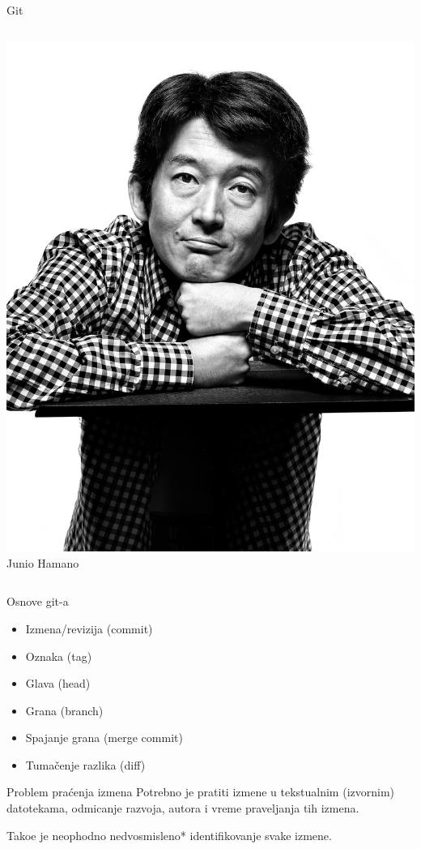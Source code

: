 \documentclass{beamer}
\begin{document}
\begin{frame}{Git}
\begin{columns}
\begin{center}
			\includegraphics[scale=0.08]{hamano.jpg}\\
			Junio Hamano
		\end{center}
	\end{columns}
\end{frame}

\begin{frame}{Osnove git-a}
	\begin{itemize}
		\item Izmena/revizija (commit)
		      \pause
		\item Oznaka (tag)
		      \pause
		\item Glava (head)
		      \pause
		\item Grana (branch)
		      \pause
		\item Spajanje grana (merge commit)
		      \pause
		\item Tuma\v cenje razlika (diff)
	\end{itemize}
\end{frame}

\begin{frame}{Problem pra\' cenja izmena}
	Potrebno je pratiti izmene u tekstualnim (izvornim) datotekama,
	odmicanje razvoja, autora i vreme praveljanja tih izmena.

	\bigskip

	Tako\dj e je neophodno nedvosmisleno* identifikovanje svake izmene.
\end{frame}
\end{document}
